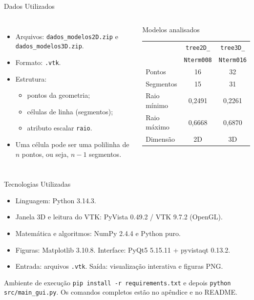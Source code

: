 \documentclass[aspectratio=169,11pt]{beamer}
\begin{document}
\begin{frame}{Dados Utilizados}
\begin{columns}
\begin{itemize}
  \item Arquivos: \texttt{dados\_modelos2D.zip} e \texttt{dados\_modelos3D.zip}.
  \item Formato: \texttt{.vtk}.
  \item Estrutura:
  \begin{itemize}
    \item pontos da geometria;
    \item células de linha (segmentos);
    \item atributo escalar \texttt{raio}.
  \end{itemize}
  \item Uma célula pode ser uma polilinha de $n$ pontos, ou seja, $n-1$ segmentos.
\end{itemize}

\begin{block}{Modelos analisados}
\small
\begin{tabular}{lcc}
\toprule
 & \texttt{tree2D\_} & \texttt{tree3D\_}\\
 & \texttt{Nterm008} & \texttt{Nterm016}\\
\midrule
Pontos & 16 & 32\\
Segmentos & 15 & 31\\
Raio mínimo & 0,2491 & 0,2261\\
Raio máximo & 0,6668 & 0,6870\\
Dimensão & 2D & 3D\\
\bottomrule
\end{tabular}
\end{block}
\end{columns}
\end{frame}

\begin{frame}{Tecnologias Utilizadas}
\begin{itemize}
  \item Linguagem: Python 3.14.3.
  \item Janela 3D e leitura do VTK: PyVista 0.49.2 / VTK 9.7.2 (OpenGL).
  \item Matemática e algoritmos: NumPy 2.4.4 e Python puro.
  \item Figuras: Matplotlib 3.10.8. Interface: PyQt5 5.15.11 + pyvistaqt 0.13.2.
  \item Entrada: arquivos \texttt{.vtk}. Saída: visualização interativa e figuras PNG.
\end{itemize}

\vspace{0.25cm}

\begin{block}{Ambiente de execução}
\texttt{pip install -r requirements.txt} e depois \texttt{python src/main\_gui.py}. Os comandos completos estão no apêndice e no README.
\end{block}
\end{frame}
\end{document}
